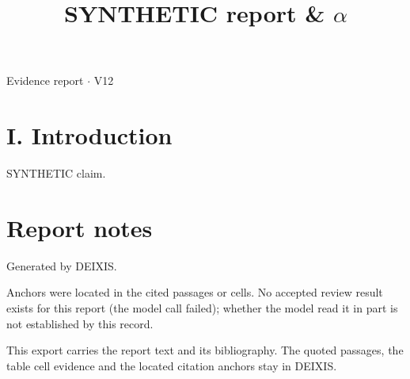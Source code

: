 \documentclass[journal]{IEEEtran}
\begin{document}
\title{SYNTHETIC report \& \ensuremath{\alpha}}

\maketitle

\noindent Evidence report \ensuremath{\cdot} V12

\section*{I. Introduction}

SYNTHETIC claim. \cite{Synth26}

\section*{Report notes}

Generated by DEIXIS.

Anchors were located in the cited passages or cells. No accepted review result exists for this report (the model call failed); whether the model read it in part is not established by this record.

This export carries the report text and its bibliography. The quoted passages, the table cell evidence and the located citation anchors stay in DEIXIS.




\end{document}
